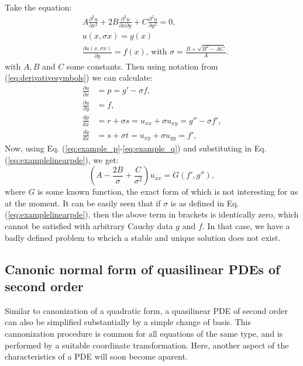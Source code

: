 Take the equation:
\begin{align}
  \label{eq:examplelinearpde}
    & A \frac{\partial ^2 u}{\partial x^2} +2B \frac{\partial ^2 u}{\partial x \partial y} +  C \frac{\partial ^2 u}{\partial y^2} =0, \nonumber \\ 
    & u(x,\sigma x) = g(x) \nonumber \\
    & \frac{\partial u(x,\sigma x)}{\partial y} = f(x) \text{, with } \sigma = \frac{B+\sqrt{B^2 - AC}}{A}. 
\end{align}
with $A,B$ and $C$ some constants. Then using notation from (\ref{eq:derivativesymbols}) we can calculate:
\begin{subequations}
\begin{align}
  \frac{\partial u}{\partial x} &= p = g'-\sigma f, \\
  \frac{\partial u}{\partial y} &= f, \\ 
  \frac{d p}{d x} &= r +\sigma s = u_{xx}+\sigma u_{xy} = g''-\sigma f', \label{eq:example_p}\\ 
  \frac{d q}{d x} &= s +\sigma t = u_{xy}+\sigma u_{yy} = f',  \label{eq:example_q}
\end{align}
\end{subequations}
Now, using Eq. (\ref{eq:example_p}-\ref{eq:example_q}) and substituting in Eq. (\ref{eq:examplelinearpde}), we get: 
\begin{equation*}
  \left ( A - \frac{2B}{\sigma} + \frac{C}{\sigma^2} \right ) u_{xx} = G(f',g''),
\end{equation*}
where $G$ is some known function, the exact form of which is not interesting for us at the moment. It can be easily seen that if $\sigma$ is as defined in Eq. (\ref{eq:examplelinearpde}), then the above term in brackets is identically zero, which cannot be satisfied with arbitrary Cauchy data $g $ and $f$. In that case, we have a badly defined problem to whcich a stable and unique solution does not exist.
\subsection{Canonic normal form of quasilinear PDEs of second order}
Similar to canonization of a quadratic form, a quasilinear PDE of second order can also be simplified substantially by a simple change of basis. This cannonization procedure is common for all equations of the same type, and is performed by a suitable coordinate transformation. Here, another aspect of the characteristics of a PDE will soon become aparent. 

